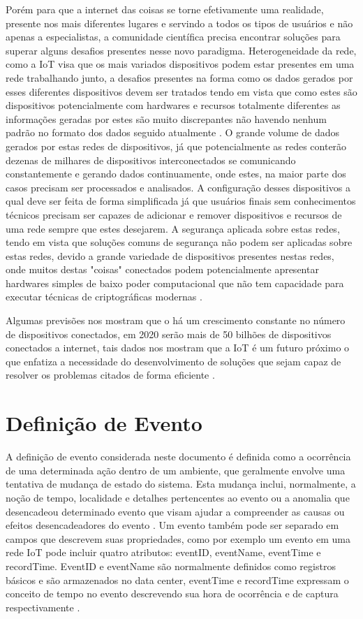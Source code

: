 \documentclass[tid,table]{texufpel} %
\begin{document}
Porém para que a internet das coisas se torne efetivamente uma realidade, presente nos mais diferentes lugares e servindo a todos os tipos de usuários e não apenas a especialistas, a comunidade científica precisa encontrar soluções para superar alguns desafios presentes nesse novo paradigma. Heterogeneidade da rede, como a IoT visa que os mais variados dispositivos podem estar presentes em uma rede trabalhando junto, a desafios presentes na forma como os dados gerados por esses diferentes dispositivos devem ser tratados tendo em vista que como estes são dispositivos potencialmente com hardwares e recursos totalmente diferentes as informações geradas por estes são muito discrepantes não havendo nenhum padrão no formato dos dados seguido atualmente \cite{agrawal2013survey}. O grande volume de dados gerados por estas redes de dispositivos, já que potencialmente as redes conterão dezenas de milhares de dispositivos interconectados se comunicando constantemente e gerando dados continuamente, onde estes, na maior parte dos casos precisam ser processados e analisados. A configuração desses dispositivos a qual deve ser feita de forma simplificada já que usuários finais sem conhecimentos técnicos precisam ser capazes de adicionar e remover dispositivos e recursos de uma rede sempre que estes desejarem. A segurança aplicada sobre estas redes, tendo em vista que soluções comuns de segurança não podem ser aplicadas sobre estas redes,  devido a grande variedade de dispositivos presentes nestas redes, onde muitos destas "coisas" conectados podem potencialmente apresentar hardwares simples de baixo poder computacional que não tem capacidade para executar técnicas de criptográficas modernas \cite{agrawal2013survey}.


Algumas previsões nos mostram que o há um crescimento constante no número de dispositivos conectados, em 2020 serão mais de 50 bilhões de dispositivos conectados a internet, tais dados nos mostram que a IoT é um futuro próximo o que enfatiza a necessidade do desenvolvimento de soluções que sejam capaz de resolver os problemas citados de forma eficiente \cite{xavier2016smart}.

\section{Definição de Evento}
A definição de evento considerada neste documento é definida como a ocorrência de uma determinada ação dentro de um ambiente, que geralmente envolve uma tentativa de mudança de estado do sistema. Esta mudança inclui, normalmente, a noção de tempo, localidade e detalhes pertencentes ao evento ou a anomalia que desencadeou determinado evento que visam ajudar a compreender as causas ou efeitos desencadeadores do evento \cite{fitzgerald2010common}.
Um evento também pode ser separado em campos que descrevem suas propriedades, como por exemplo um evento em uma rede IoT pode incluir quatro atributos: eventID, eventName, eventTime e recordTime. EventID e eventName são normalmente definidos como registros básicos e são armazenados no data center, eventTime e recordTime expressam o conceito de tempo no evento descrevendo sua hora de ocorrência e de captura respectivamente \cite{minbo2013information}. 
\end{document}
